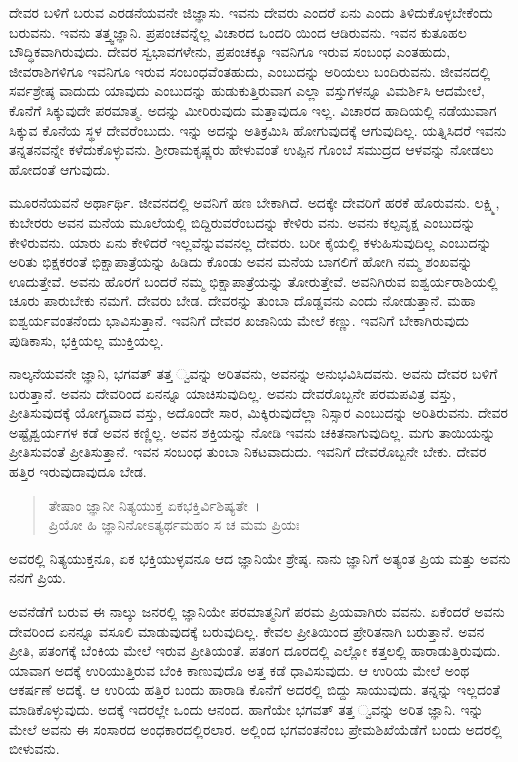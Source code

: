 ದೇವರ ಬಳಿಗೆ ಬರುವ ಎರಡನೆಯವನೇ ಜಿಜ್ಞಾಸು. ಇವನು ದೇವರು ಎಂದರೆ ಏನು ಎಂದು ತಿಳಿದುಕೊಳ್ಳಬೇಕೆಂದು ಬರುವನು. ಇವನು ತತ್ತ್ವಜ್ಞಾನಿ. ಪ್ರಪಂಚವನ್ನೆಲ್ಲ ವಿಚಾರದ ಒಂದರಿ ಯಿಂದ ಆಡಿರುವನು. ಇವನ ಕುತೂಹಲ ಬೌದ್ಧಿಕವಾಗಿರುವುದು. ದೇವರ ಸ್ವಭಾವಗಳೇನು, ಪ್ರಪಂಚಕ್ಕೂ ಇವನಿಗೂ ಇರುವ ಸಂಬಂಧ ಎಂತಹುದು, ಜೀವರಾಶಿಗಳಿಗೂ ಇವನಿಗೂ ಇರುವ ಸಂಬಂಧವೆಂತಹುದು, ಎಂಬುದನ್ನು ಅರಿಯಲು ಬಂದಿರುವನು. ಜೀವನದಲ್ಲಿ ಸರ್ವಶ್ರೇಷ್ಠ ವಾದುದು ಯಾವುದು ಎಂಬುದನ್ನು ಹುಡುಕುತ್ತಿರುವಾಗ ಎಲ್ಲಾ ವಸ್ತುಗಳನ್ನೂ ವಿಮರ್ಶಿಸಿ ಆದಮೇಲೆ, ಕೊನೆಗೆ ಸಿಕ್ಕುವುದೇ ಪರಮಾತ್ಮ. ಅದನ್ನು ಮೀರಿರುವುದು ಮತ್ತಾವುದೂ ಇಲ್ಲ. ವಿಚಾರದ ಹಾದಿಯಲ್ಲಿ ನಡೆಯುವಾಗ ಸಿಕ್ಕುವ ಕೊನೆಯ ಸ್ಥಳ ದೇವರೆಂಬುದು. ಇನ್ನು ಅದನ್ನು ಅತಿಕ್ರಮಿಸಿ ಹೋಗುವುದಕ್ಕೆ ಆಗುವುದಿಲ್ಲ. ಯತ್ನಿಸಿದರೆ ಇವನು ತನ್ನತನವನ್ನೇ ಕಳೆದುಕೊಳ್ಳುವನು. ಶ‍್ರೀರಾಮಕೃಷ್ಣರು ಹೇಳುವಂತೆ ಉಪ್ಪಿನ ಗೊಂಬೆ ಸಮುದ್ರದ ಆಳವನ್ನು ನೋಡಲು ಹೋದಂತೆ ಆಗುವುದು.

ಮೂರನೆಯವನೆ ಅರ್ಥಾರ್ಥಿ. ಜೀವನದಲ್ಲಿ ಅವನಿಗೆ ಹಣ ಬೇಕಾಗಿದೆ. ಅದಕ್ಕೇ ದೇವರಿಗೆ ಹರಕೆ ಹೊರುವನು. ಲಕ್ಷ್ಮಿ, ಕುಬೇರರು ಅವನ ಮನೆಯ ಮೂಲೆಯಲ್ಲಿ ಬಿದ್ದಿರುವರೆಂಬದನ್ನು ಕೇಳಿರು ವನು. ಅವನು ಕಲ್ಪವೃಕ್ಷ ಎಂಬುದನ್ನು ಕೇಳಿರುವನು. ಯಾರು ಏನು ಕೇಳಿದರೆ ಇಲ್ಲವೆನ್ನುವವನಲ್ಲ ದೇವರು. ಬರೀ ಕೈಯಲ್ಲಿ ಕಳುಹಿಸುವುದಿಲ್ಲ ಎಂಬುದನ್ನು ಅರಿತು ಭಿಕ್ಷಕರಂತೆ ಭಿಕ್ಷಾಪಾತ್ರೆಯನ್ನು ಹಿಡಿದು ಕೊಂಡು ಅವನ ಮನೆಯ ಬಾಗಲಿಗೆ ಹೋಗಿ ನಮ್ಮ ಶಂಖವನ್ನು ಊದುತ್ತೇವೆ. ಅವನು ಹೊರಗೆ ಬಂದರೆ ನಮ್ಮ ಭಿಕ್ಷಾಪಾತ್ರೆಯನ್ನು ತೋರುತ್ತೇವೆ. ಅವನಿಗಿರುವ ಐಶ್ವರ್ಯರಾಶಿಯಲ್ಲಿ ಚೂರು ಪಾರುಬೇಕು ನಮಗೆ. ದೇವರು ಬೇಡ. ದೇವರನ್ನು ತುಂಬಾ ದೊಡ್ಡವನು ಎಂದು ನೋಡುತ್ತಾನೆ. ಮಹಾ ಐಶ್ವರ್ಯವಂತನೆಂದು ಭಾವಿಸುತ್ತಾನೆ. ಇವನಿಗೆ ದೇವರ ಖಜಾನಿಯ ಮೇಲೆ ಕಣ್ಣು. ಇವನಿಗೆ ಬೇಕಾಗಿರುವುದು ಪುಡಿಕಾಸು, ಭಕ್ತಿಯಲ್ಲ ಮುಕ್ತಿಯಲ್ಲ.

ನಾಲ್ಕನೆಯವನೇ ಜ್ಞಾನಿ, ಭಗವತ್ ತತ್ತ ್ವವನ್ನು ಅರಿತವನು, ಅವನನ್ನು ಅನುಭವಿಸಿದವನು. ಅವನು ದೇವರ ಬಳಿಗೆ ಬರುತ್ತಾನೆ. ಅವನು ದೇವರಿಂದ ಏನನ್ನೂ ಯಾಚಿಸುವುದಿಲ್ಲ. ಅವನು ದೇವರೊಬ್ಬನೇ ಪರಮಪವಿತ್ರ ವಸ್ತು, ಪ್ರೀತಿಸುವುದಕ್ಕೆ ಯೋಗ್ಯವಾದ ವಸ್ತು, ಅದೊಂದೇ ಸಾರ, ಮಿಕ್ಕಿರುವುದೆಲ್ಲಾ ನಿಸ್ಸಾರ ಎಂಬುದನ್ನು ಅರಿತಿರುವನು. ದೇವರ ಅಷ್ಟೈಶ್ವರ್ಯಗಳ ಕಡೆ ಅವನ ಕಣ್ಣಿಲ್ಲ. ಅವನ ಶಕ್ತಿಯನ್ನು ನೋಡಿ ಇವನು ಚಕಿತನಾಗುವುದಿಲ್ಲ. ಮಗು ತಾಯಿಯನ್ನು ಪ್ರೀತಿಸುವಂತೆ ಪ್ರೀತಿಸುತ್ತಾನೆ. ಇವನ ಸಂಬಂಧ ತುಂಬಾ ನಿಕಟವಾದುದು. ಇವನಿಗೆ ದೇವರೊಬ್ಬನೇ ಬೇಕು. ದೇವರ ಹತ್ತಿರ ಇರುವುದಾವುದೂ ಬೇಡ.

\begin{verse}
ತೇಷಾಂ ಜ್ಞಾನೀ ನಿತ್ಯಯುಕ್ತ ಏಕಭಕ್ತಿರ್ವಿಶಿಷ್ಯತೇ~।\\ಪ್ರಿಯೋ ಹಿ ಜ್ಞಾನಿನೋಽತ್ಯರ್ಥಮಹಂ ಸ ಚ ಮಮ ಪ್ರಿಯಃ 
\end{verse}

{\small ಅವರಲ್ಲಿ ನಿತ್ಯಯುಕ್ತನೂ, ಏಕ ಭಕ್ತಿಯುಳ್ಳವನೂ ಆದ ಜ್ಞಾನಿಯೇ ಶ್ರೇಷ್ಠ. ನಾನು ಜ್ಞಾನಿಗೆ ಅತ್ಯಂತ ಪ್ರಿಯ ಮತ್ತು ಅವನು ನನಗೆ ಪ್ರಿಯ.}

ಅವನೆಡೆಗೆ ಬರುವ ಈ ನಾಲ್ಕು ಜನರಲ್ಲಿ ಜ್ಞಾನಿಯೇ ಪರಮಾತ್ಮನಿಗೆ ಪರಮ ಪ್ರಿಯವಾಗಿರು ವವನು. ಏಕೆಂದರೆ ಅವನು ದೇವರಿಂದ ಏನನ್ನೂ ವಸೂಲಿ ಮಾಡುವುದಕ್ಕೆ ಬರುವುದಿಲ್ಲ. ಕೇವಲ ಪ್ರೀತಿಯಿಂದ ಪ್ರೇರಿತನಾಗಿ ಬರುತ್ತಾನೆ. ಅವನ ಪ್ರೀತಿ, ಪತಂಗಕ್ಕೆ ಬೆಂಕಿಯ ಮೇಲೆ ಇರುವ ಪ್ರೀತಿಯಂತೆ. ಪತಂಗ ದೂರದಲ್ಲಿ ಎಲ್ಲೋ ಕತ್ತಲಲ್ಲಿ ಹಾರಾಡುತ್ತಿರುವುದು. ಯಾವಾಗ ಅದಕ್ಕೆ ಉರಿಯುತ್ತಿರುವ ಬೆಂಕಿ ಕಾಣುವುದೊ ಅತ್ತ ಕಡೆ ಧಾವಿಸುವುದು. ಆ ಉರಿಯ ಮೇಲೆ ಅಂಥ ಆಕರ್ಷಣೆ ಅದಕ್ಕೆ. ಆ ಉರಿಯ ಹತ್ತಿರ ಬಂದು ಹಾರಾಡಿ ಕೊನೆಗೆ ಅದರಲ್ಲಿ ಬಿದ್ದು ಸಾಯುವುದು. ತನ್ನನ್ನು ಇಲ್ಲದಂತೆ ಮಾಡಿಕೊಳ್ಳುವುದು. ಅದಕ್ಕೆ ಇದರಲ್ಲೇ ಒಂದು ಆನಂದ. ಹಾಗೆಯೇ ಭಗವತ್ ತತ್ತ ್ವವನ್ನು ಅರಿತ ಜ್ಞಾನಿ. ಇನ್ನು ಮೇಲೆ ಅವನು ಈ ಸಂಸಾರದ ಅಂಧಕಾರದಲ್ಲಿರಲಾರ. ಅಲ್ಲಿಂದ ಭಗವಂತನೆಂಬ ಪ್ರೇಮಶಿಖೆಯೆಡೆಗೆ ಬಂದು ಅದರಲ್ಲಿ ಬೀಳುವನು.

